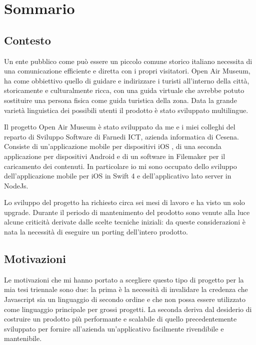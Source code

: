 \chapter*{Sommario} %
\label{sommario}

\vspace{5mm}

\section{Contesto}\vspace{5mm}

Un ente pubblico come può essere un piccolo comune storico italiano necessita di una comunicazione efficiente e diretta con i propri visitatori. Open Air Museum, ha come obbiettivo quello di guidare e indirizzare i turisti all’interno della città, storicamente e culturalmente ricca, con una guida virtuale che avrebbe potuto sostituire una persona fisica come guida turistica della zona. Data la grande varietà linguistica dei possibili utenti il prodotto è stato sviluppato multilingue.\vspace{5mm}

Il progetto Open Air Museum è stato sviluppato da me e i miei colleghi del reparto di Sviluppo Software di Farnedi ICT\cite{FICT}, azienda informatica di Cesena. Consiste di un’applicazione mobile per dispositivi iOS\cite{IOS} , di una seconda applicazione per dispositivi Android\cite{ANDROID} e di un software in Filemaker\cite{FileMaker} per il caricamento dei contenuti. In particolare io mi sono occupato dello sviluppo dell’applicazione mobile per iOS\cite{IOS} in Swift 4\cite{Swift} e dell’applicativo lato server in NodeJs\cite{Nodejs}.\vspace{5mm}

Lo sviluppo del progetto ha richiesto circa sei mesi di lavoro e ha visto un solo upgrade. Durante il periodo di mantenimento del prodotto sono venute alla luce alcune criticità derivate dalle scelte tecniche iniziali: da queste considerazioni è nata la necessità di eseguire un porting dell'intero prodotto. 

\section{Motivazioni}\vspace{5mm}

Le motivazioni che mi hanno portato a scegliere questo tipo di progetto per la mia tesi triennale sono due: la prima è la necessità di invalidare la credenza che Javascript\cite{JS} sia un linguaggio di secondo ordine e che non possa essere utilizzato come linguaggio principale per grossi progetti. La seconda deriva dal desiderio di costruire un prodotto più performante e scalabile di quello precedentemente sviluppato per fornire all'azienda un'applicativo facilmente rivendibile e mantenibile. 

